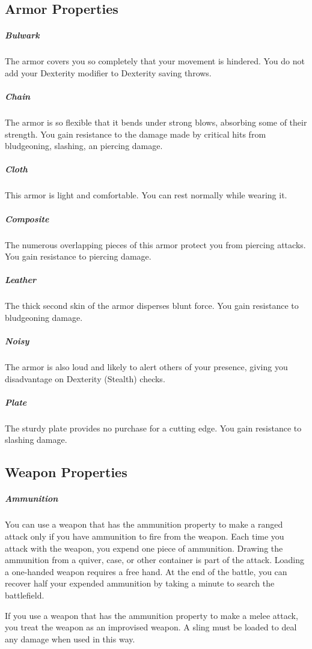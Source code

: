 
\subsection*{Armor Properties} \label{ssec::armorproperties}
    \subparagraph{Bulwark} The armor covers you so completely that your movement is hindered.
    You do not add your Dexterity modifier to Dexterity saving throws.

    \subparagraph{Chain} The armor is so flexible that it bends under strong blows, absorbing some of their strength.
    You gain resistance to the damage made by critical hits from bludgeoning, slashing, an piercing damage.

    \subparagraph{Cloth} This armor is light and comfortable.
    You can rest normally while wearing it.

    \subparagraph{Composite} The numerous overlapping pieces of this armor protect you from piercing attacks.
    You gain resistance to piercing damage.

    \subparagraph{Leather} The thick second skin of the armor disperses blunt force.
    You gain resistance to bludgeoning damage.

    \subparagraph{Noisy} The armor is also loud and likely to alert others of your presence, giving you disadvantage on Dexterity (Stealth) checks.

    \subparagraph{Plate} The sturdy plate provides no purchase for a cutting edge.
    You gain resistance to slashing damage.

\subsection*{Weapon Properties} \label{ssec::weaponproperties}
    \subparagraph{Ammunition} You can use a weapon that has the ammunition property to make a ranged attack only if you have ammunition to fire from the weapon.
    Each time you attack with the weapon, you expend one piece of ammunition.
    Drawing the ammunition from a quiver, case, or other container is part of the attack.
    Loading a one-handed weapon requires a free hand.
    At the end of the battle, you can recover half your expended ammunition by taking a minute to search the battlefield.

    If you use a weapon that has the ammunition property to make a melee attack, you treat the weapon as an improvised weapon.
    A sling must be loaded to deal any damage when used in this way.

